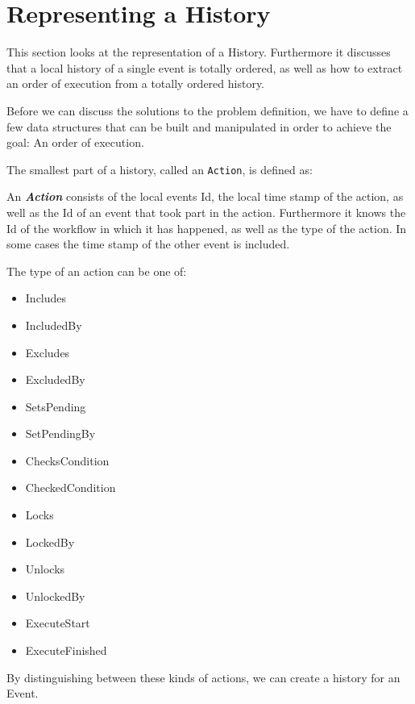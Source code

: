 \chapter{Representing a History}\label{chap:representing-a-history}
	This section looks at the representation of a History. Furthermore it discusses that a local history of a single event is totally ordered, as well as how to extract an order of execution from a totally ordered history.

	\newpar Before we can discuss the solutions to the problem definition, we have to define a few data structures that can be built and manipulated in order to achieve the goal: An order of execution.
	
	\newpar The smallest part of a history, called an \texttt{Action}, is defined as:
	
	\newpar
	\begin{definition}
		An \textit{\textbf{Action}} consists of the local events Id, the local time stamp of the action, as well as the Id of an event that took part in the action. Furthermore it knows the Id of the workflow in which it has happened, as well as the type of the action. In some cases the time stamp of the other event is included.
	\end{definition}
	
	\newpar The type of an action can be one of:
	\begin{multicols}{3}
		\begin{itemize}
			\item Includes
			\item IncludedBy
			\item Excludes
			\item ExcludedBy
			\item SetsPending
			\item SetPendingBy
			\item ChecksCondition
			\item CheckedCondition
			\item Locks
			\item LockedBy
			\item Unlocks
			\item UnlockedBy
			\item ExecuteStart
			\item ExecuteFinished
		\end{itemize}
	\end{multicols}
	\noindent By distinguishing between these kinds of actions, we can create a history for an Event.
	
